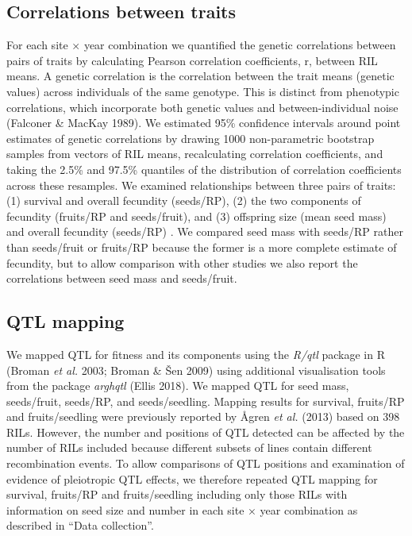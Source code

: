 \documentclass[]{article}
\begin{document}
\hypertarget{correlations-between-traits}{%
\subsection{Correlations between traits}\label{correlations-between-traits}}

For each site × year combination we quantified the genetic correlations between pairs of traits by calculating Pearson correlation coefficients, r, between RIL means. A genetic correlation is the correlation between the trait means (genetic values) across individuals of the same genotype. This is distinct from phenotypic correlations, which incorporate both genetic values and between-individual noise (Falconer \& MacKay 1989). We estimated 95\% confidence intervals around point estimates of genetic correlations by drawing 1000 non-parametric bootstrap samples from vectors of RIL means, recalculating correlation coefficients, and taking the 2.5\% and 97.5\% quantiles of the distribution of correlation coefficients across these resamples. We examined relationships between three pairs of traits: (1) survival and overall fecundity (seeds/RP), (2) the two components of fecundity (fruits/RP and seeds/fruit), and (3) offspring size (mean seed mass) and overall fecundity (seeds/RP) . We compared seed mass with seeds/RP rather than seeds/fruit or fruits/RP because the former is a more complete estimate of fecundity, but to allow comparison with other studies we also report the correlations between seed mass and seeds/fruit.

\hypertarget{qtl-mapping}{%
\subsection{QTL mapping}\label{qtl-mapping}}

We mapped QTL for fitness and its components using the \emph{R/qtl} package in R (Broman \emph{et al.} 2003; Broman \& Šen 2009) using additional visualisation tools from the package \emph{arghqtl} (Ellis 2018). We mapped QTL for seed mass, seeds/fruit, seeds/RP, and seeds/seedling. Mapping results for survival, fruits/RP and fruits/seedling were previously reported by Ågren \emph{et al.} (2013) based on 398 RILs. However, the number and positions of QTL detected can be affected by the number of RILs included because different subsets of lines contain different recombination events. To allow comparisons of QTL positions and examination of evidence of pleiotropic QTL effects, we therefore repeated QTL mapping for survival, fruits/RP and fruits/seedling including only those RILs with information on seed size and number in each site × year combination as described in ``Data collection''.
\end{document}
